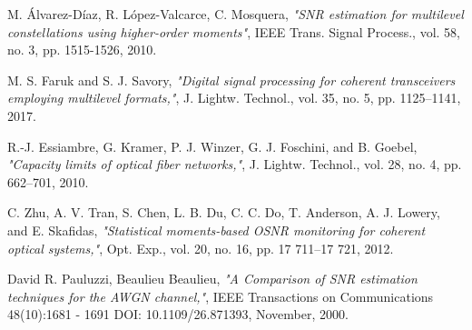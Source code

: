 \documentclass[12pt]{report}
\begin{document}
\begin{thebibliography}{9}
	M. Álvarez-Díaz, R. López-Valcarce, C. Mosquera, 
	\textit{"SNR estimation for multilevel constellations using higher-order moments"}, 
	IEEE Trans. Signal Process., vol. 58, no. 3, pp. 1515-1526, 2010.
	
	M. S. Faruk and S. J. Savory,
	\textit{"Digital signal processing for coherent transceivers employing multilevel formats,"}, 
	J. Lightw. Technol., vol. 35, no. 5, pp. 1125–1141, 2017.

	R.-J. Essiambre, G. Kramer, P. J. Winzer, G. J. Foschini, and B. Goebel,
	\textit{"Capacity limits of optical fiber networks,"}, 
	J. Lightw. Technol., vol. 28, no. 4, pp. 662–701, 2010.
	
	C. Zhu, A. V. Tran, S. Chen, L. B. Du, C. C. Do, T. Anderson, A. J. Lowery, and E. Skafidas,
	\textit{"Statistical moments-based OSNR monitoring for coherent optical systems,"}, 
	Opt. Exp., vol. 20, no. 16, pp. 17 711–17 721, 2012.
	
	David R. Pauluzzi, Beaulieu Beaulieu,
	\textit{"A Comparison of SNR estimation techniques for the AWGN channel,"}, 
	IEEE Transactions on Communications 48(10):1681 - 1691 DOI: 10.1109/26.871393, November, 2000.
		

	
\end{thebibliography}
\end{document}
